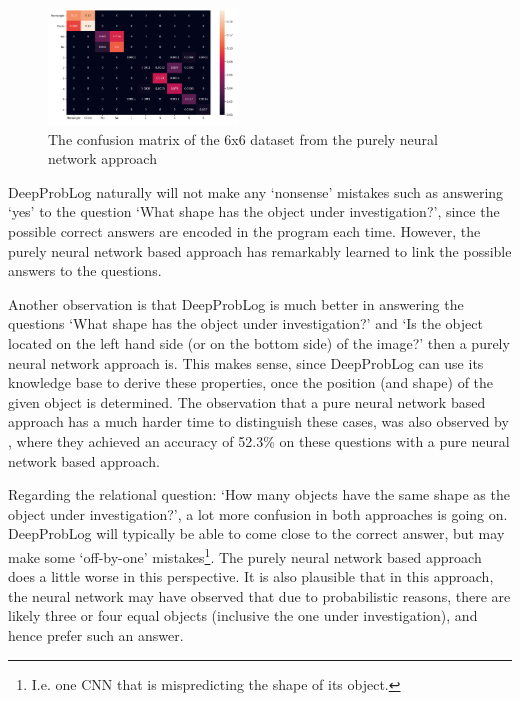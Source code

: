 \documentclass[english]{sobraep}
\begin{document}
\begin{figure}[htp]
    \begin{center}
    \includegraphics[width=0.45\textwidth]{confusion_matrix_6x6_pure_NN.png} 
    \captionsetup{justification=centering}
    \caption{The confusion matrix of the 6x6 dataset from the purely neural network approach}
    \label{fig:confusion_matrix_6x6_pure_nn}
    \end{center}
\end{figure}

DeepProbLog naturally will not make any `nonsense' mistakes such as answering `yes' to the question `What shape has the object under investigation?', since the possible correct answers are encoded in the program each time. However, the purely neural network based approach has remarkably learned to link the possible answers to the questions.

Another observation is that DeepProbLog is much better in answering the questions `What shape has the object under investigation?' and `Is the object located on the left hand side (or on the bottom side) of the image?' then a purely neural network approach is. This makes sense, since DeepProbLog can use its knowledge base to derive these properties, once the position (and shape) of the given object is determined. The observation that a pure neural network based approach has a much harder time to distinguish these cases, was also observed by \cite{sort_of_clevr_dataset}, where they achieved an accuracy of 52.3\% on these questions with a pure neural network based approach.

Regarding the relational question: `How many objects have the same shape as the object under investigation?', a lot more confusion in both approaches is going on. DeepProbLog will typically be able to come close to the correct answer, but may make some `off-by-one' mistakes\footnote{I.e. one CNN that is mispredicting the shape of its object.}. The purely neural network based approach does a little worse in this perspective. It is also plausible that in this approach, the neural network may have observed that due to probabilistic reasons, there are likely three or four equal objects (inclusive the one under investigation), and hence prefer such an answer.
\end{document}
